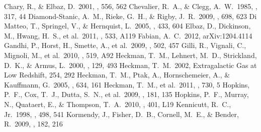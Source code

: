 \documentclass[apj]{emulateapj}
\begin{document}
\begin{thebibliography}{}
 Chary, R., \& Elbaz, D.\ 2001,
  \apj, 556, 562
 Chevalier, R.~A., \& Clegg,
  A.~W.\ 1985, \nat, 317, 44
 Diamond-Stanic, A.~M.,
  Rieke, G.~H., \& Rigby, J.~R.\ 2009, \apj, 698, 623
 Di Matteo, T., Springel, V.,
  \& Hernquist, L.\ 2005, \nat, 433, 604
 Elbaz, D., Dickinson, M., Hwang,
  H.~S., et al.\ 2011, \aap, 533, A119
 Fabian, A.~C.\ 2012,
  arXiv:1204.4114
 Gandhi, P., Horst, H., Smette,
  A., et al.\ 2009, \aap, 502, 457
 Gilli, R., Vignali, C., Mignoli,
  M., et al.\ 2010, \aap, 519, A92
 Heckman, T.~M., Lehnert, M.~D.,
  Strickland, D.~K., \& Armus, L.\ 2000, \apjs, 129, 493
 Heckman, T.~M.\ 2002, Extragalactic Gas
  at Low Redshift, 254, 292
 Heckman, T.~M., Ptak, A.,
  Hornschemeier, A., \& Kauffmann, G.\ 2005, \apj, 634, 161
 Heckman, T.~M., et al.\ 2011,
  \apj, 730, 5
 Hopkins, P.~F., Cox, T.~J.,
  Dutta, S.~N., et al.\ 2009, \apjs, 181, 135
 Hopkins, P.~F., Murray, N.,
  Quataert, E., \& Thompson, T.~A.\ 2010, \mnras, 401, L19
 Kennicutt, R.~C., Jr.\ 1998, \apj,
  498, 541
 Kormendy, J., Fisher, D.~B.,
  Cornell, M.~E., \& Bender, R.\ 2009, \apjs, 182, 216

\end{thebibliography}
\end{document}
